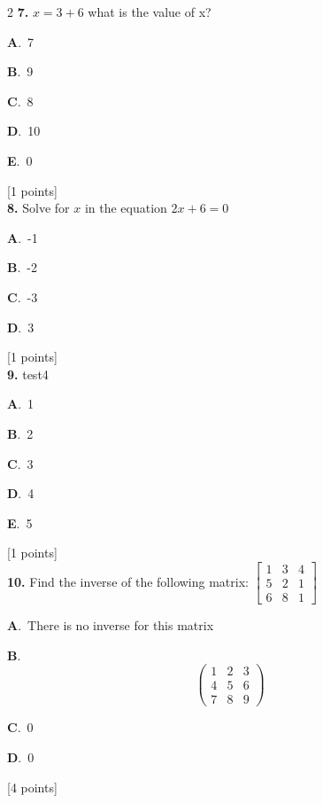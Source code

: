 \documentclass[12pt]{article}
\newcommand{\choice}[3]{%
  \noindent\textbf{#1}.~#2\hfill#3\par\vspace{0.25em}
}
\begin{document}
\begin{multicols}{2}
\noindent \textbf{\textenglish{7.}} \(x=3+6 \){\textenglish{ what is the value of x?}}

\noindent\choice{A}{{\textenglish{7}}}{}
\noindent\choice{B}{{\textenglish{9}}}{}
\noindent\choice{C}{{\textenglish{8}}}{}
\noindent\choice{D}{{\textenglish{10}}}{}
\noindent\choice{E}{{\textenglish{0}}}{}
\hfill {\textenglish{[1 points]}}\\[0.5em]

\noindent \textbf{\textenglish{8.}} {\textenglish{Solve for }}\(x \){\textenglish{ in the equation }}\(2x+6 = 0 \)

\noindent\choice{A}{{\textenglish{-1}}}{}
\noindent\choice{B}{{\textenglish{-2}}}{}
\noindent\choice{C}{{\textenglish{-3}}}{}
\noindent\choice{D}{{\textenglish{3}}}{}
\hfill {\textenglish{[1 points]}}\\[0.5em]

\noindent \textbf{\textenglish{9.}} {\textenglish{test4}}

\noindent\choice{A}{{\textenglish{1}}}{}
\noindent\choice{B}{{\textenglish{2}}}{}
\noindent\choice{C}{{\textenglish{3}}}{}
\noindent\choice{D}{{\textenglish{4}}}{}
\noindent\choice{E}{{\textenglish{5}}}{}
\hfill {\textenglish{[1 points]}}\\[0.5em]

\noindent \textbf{\textenglish{10.}} {\textenglish{Find the inverse of the following matrix: }}\(\begin{bmatrix} 1 & 3 & 4 \\ 5 & 2 & 1 \\ 6 & 8 & 1 \end{bmatrix}\)

\noindent\choice{A}{{\textenglish{There is no inverse for this matrix}}}{}
\noindent\choice{B}{\[\begin{pmatrix} 1 & 2 & 3 \\ 4 & 5 & 6 \\ 7 & 8 & 9  \end{pmatrix}\]}{}
\noindent\choice{C}{{\textenglish{0}}}{}
\noindent\choice{D}{{\textenglish{0}}}{}
\hfill {\textenglish{[4 points]}}\\[0.5em]


\end{multicols}
\end{document}
